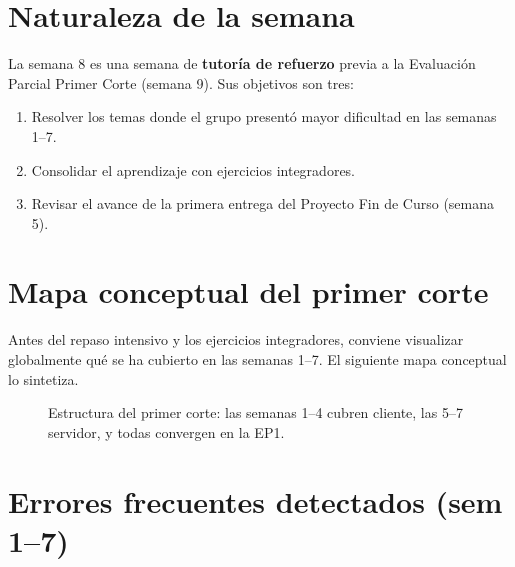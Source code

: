 \documentclass[11pt,a4paper,openany]{book}
\begin{document}
\section*{Naturaleza de la semana}
La semana 8 es una semana de \textbf{tutoría de refuerzo} previa a la
Evaluación Parcial Primer Corte (semana 9). Sus objetivos son tres:
\begin{enumerate}
\item Resolver los temas donde el grupo presentó mayor dificultad
en las semanas 1--7.
\item Consolidar el aprendizaje con ejercicios integradores.
\item Revisar el avance de la primera entrega del Proyecto Fin de
Curso (semana 5).
\end{enumerate}

\section{Mapa conceptual del primer corte}

Antes del repaso intensivo y los ejercicios integradores,
conviene visualizar globalmente qué se ha cubierto en las semanas
1--7. El siguiente mapa conceptual lo sintetiza.


\begin{figure}[htbp]
\centering
{}
\caption{Estructura del primer corte: las semanas 1--4 cubren cliente,
las 5--7 servidor, y todas convergen en la EP1.}
\end{figure}

\section{Errores frecuentes detectados (sem 1--7)}
\end{document}
